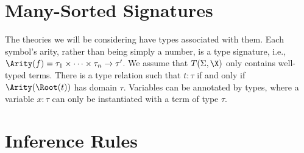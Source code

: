 \section{Many-Sorted Signatures}\label{sec:types}

The theories we will be considering have types associated with them. Each
symbol's arity, rather than being simply a number, is a type signature, i.e.,
$\Arity(f) = \tau_1 \times \dotsb \times \tau_n \to \tau'$. We assume that
$T(\Sigma, \X)$ only contains well-typed terms. There is a type relation such
that $t : \tau$ if and only if $\Arity(\Root(t))$ has domain $\tau$. Variables
can be annotated by types, where a variable $x {:} \tau$ can only be
instantiated with a term of type $\tau$.

\section{Inference Rules}\label{sec:inf-rules}

